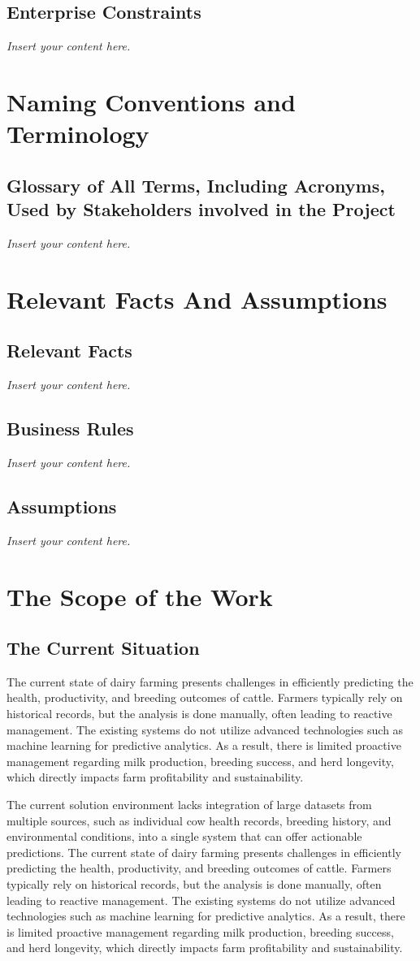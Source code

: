 \documentclass[12pt]{article}
\newcommand{\lips}{\textit{Insert your content here.}}
\begin{document}
\subsection{Enterprise Constraints}
\lips

\section{Naming Conventions and Terminology}
\subsection{Glossary of All Terms, Including Acronyms, Used by Stakeholders
involved in the Project}
\lips

\section{Relevant Facts And Assumptions}
\subsection{Relevant Facts}
\lips
\subsection{Business Rules}
\lips
\subsection{Assumptions}
\lips

\section{The Scope of the Work}
\subsection{The Current Situation}
The current state of dairy farming presents challenges in efficiently predicting
the health, productivity, and breeding outcomes of cattle. Farmers typically rely 
on historical records, but the analysis is done manually, often leading to 
reactive management. The existing systems do not utilize advanced technologies 
such as machine learning for predictive analytics. As a result, there is limited 
proactive management regarding milk production, breeding success, and herd longevity, 
which directly impacts farm profitability and sustainability.

The current solution environment lacks integration of large datasets from multiple 
sources, such as individual cow health records, breeding history, and environmental 
conditions, into a single system that can offer actionable predictions.
The current state of dairy farming presents challenges in efficiently predicting
the health, productivity, and breeding outcomes of cattle. Farmers typically rely 
on historical records, but the analysis is done manually, often leading to 
reactive management. The existing systems do not utilize advanced technologies 
such as machine learning for predictive analytics. As a result, there is limited 
proactive management regarding milk production, breeding success, and herd longevity, 
which directly impacts farm profitability and sustainability.
\end{document}
